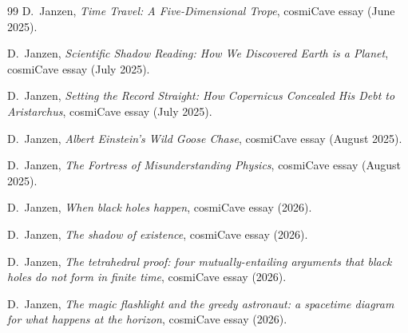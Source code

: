 \documentclass[11pt,a4paper]{article}
\theoremstyle{definition}
\begin{document}
\begin{thebibliography}{99}
D.~Janzen,
\emph{Time Travel: A Five-Dimensional Trope},
cosmiCave essay (June 2025).

D.~Janzen,
\emph{Scientific Shadow Reading: How We Discovered Earth is a Planet},
cosmiCave essay (July 2025).

D.~Janzen,
\emph{Setting the Record Straight: How Copernicus Concealed His Debt to Aristarchus},
cosmiCave essay (July 2025).

D.~Janzen,
\emph{Albert Einstein's Wild Goose Chase},
cosmiCave essay (August 2025).

D.~Janzen,
\emph{The Fortress of Misunderstanding Physics},
cosmiCave essay (August 2025).

D.~Janzen,
\emph{When black holes happen},
cosmiCave essay (2026).

D.~Janzen,
\emph{The shadow of existence},
cosmiCave essay (2026).

D.~Janzen,
\emph{The tetrahedral proof: four mutually-entailing arguments that black holes do not form in finite time},
cosmiCave essay (2026).

D.~Janzen,
\emph{The magic flashlight and the greedy astronaut: a spacetime diagram for what happens at the horizon},
cosmiCave essay (2026).

\end{thebibliography}
\end{document}
